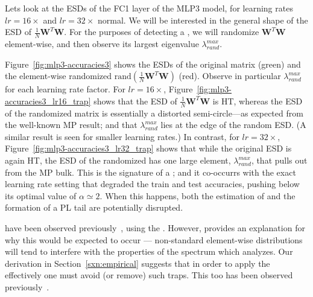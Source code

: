 %
Lets look at the ESDs of the FC1 layer of the MLP3 model, for learning rates $lr=16\times$ and $lr=32\times$ normal. 
We will be interested in the general shape of the ESD of $\tfrac{1}{N}\mathbf{W}^T\mathbf{W}$.
For the purposes of detecting a \CorrelationTrap, we will randomize $\mathbf{W}^T\mathbf{W}$ element-wise, and then observe its largest eigenvalue $\lambda^{max}_{rand}$. 

Figure~\ref{fig:mlp3-accuracies3} shows the ESDs of the original matrix (green) and the element-wise 
randomized $\mbox{rand}(\tfrac{1}{N}\mathbf{W}^T\mathbf{W})$ (red). 
Observe in particular $\lambda^{max}_{rand}$ for each learning rate factor.
For $lr=16\times$, Figure~\ref{fig:mlp3-accuracies3_lr16_trap} shows 
that the ESD of $\tfrac{1}{N}\mathbf{W}^T\mathbf{W}$ is HT, whereas the ESD of the randomized matrix is essentially a distorted semi-circle---as expected from the well-known MP result; and 
that $\lambda^{max}_{rand}$ lies at the edge of the random \MPBulk ESD.
(A similar result is seen for smaller learning rates.)  
In contrast, for $lr=32\times$, Figure~\ref{fig:mlp3-accuracies3_lr32_trap} shows 
that while the original ESD is again HT, the ESD of the randomized has one large element, $\lambda^{max}_{rand}$, that pulls out from the MP bulk.
%
This is the signature of a \CorrelationTrap; and it co-occurrs with the exact learning rate setting that degraded the train and test accuracies, pushing \ALPHA below its optimal value of $\alpha\simeq 2$.
%
When this happens,  both the estimation of \ALPHA and the formation of a PL tail are potentially disrupted. 
%

\CorrelationTraps have been observed previously~\cite{MM20a_trends_NatComm,MM21a_simpsons_TR}, using the \HTSR \Phenomenology.
However, \SETOL provides an explanation for why this would be expected to occur --- non-standard element-wise distributions will tend to interfere with the properties of the spectrum which \SETOL analyzes. 
Our derivation in Section~\ref{sxn:empirical} suggests that in order to apply the \SETOL effectively one must avoid (or remove) such traps. 
This too has been observed previously~\cite{MM20a_trends_NatComm,MM21a_simpsons_TR}. 


